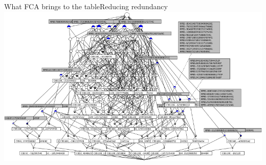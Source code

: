 \begin{frame}{What FCA brings to the table}{Reducing redundancy}
\vspace{0pt}
\centering
\includegraphics[width=\linewidth]{img/fca/lattice_redundancy}
\end{frame}


%

